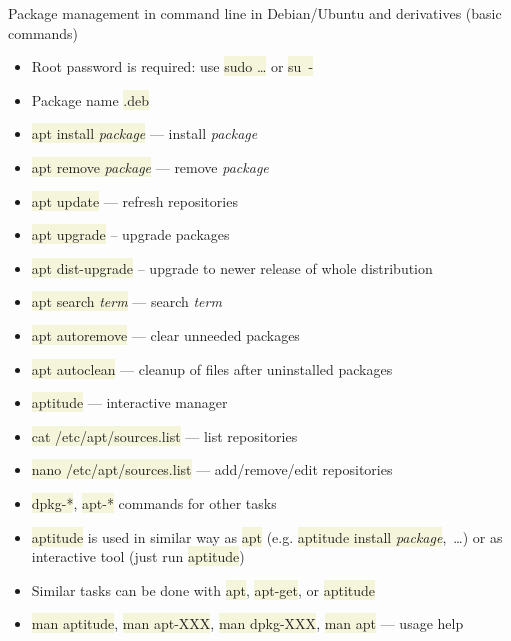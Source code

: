 \documentclass[compress, xelatex, 11pt, xcolor=svgnames, aspectratio=169,
	hyperref={
		bookmarks=true,
		unicode=true,
		colorlinks=true,
		pdftitle={Linux, command line and MetaCentrum},
		plainpages=false,
		pdfauthor={Vojtech Zeisek},
		pdfsubject={Course about use of Linux command line, writing shell scripts and using MetaCentrum of CESNET},
		pdfcreator={XeLaTeX},
		pdfkeywords={Linux, GNU, BASH, shell, command line, MetaCentrum},
		linkcolor=DarkRed, %
		anchorcolor=DarkBlue, %
		citecolor=Indigo, %
		filecolor=NavyBlue, %
		menucolor=DarkMagenta, %
		urlcolor=DarkBlue, %
		},
	url={hyphens, lowtilde} %
	]{beamer}
\renewcommand{\texttt}[1]{\colorbox{Beige}{{\ttfamily #1}}}
\begin{document}
\begin{frame}[allowframebreaks]{Package management in command line in Debian/Ubuntu and derivatives (basic commands)}
	\begin{itemize}
		\item Root password is required: use \texttt{sudo \ldots} or \texttt{su~-}
		\item Package name \texttt{*.deb}
		\item \texttt{apt install \textit{package}} --- install \textit{package}
		\item \texttt{apt remove \textit{package}} --- remove \textit{package}
		\item \texttt{apt update} --- refresh repositories
		\item \texttt{apt upgrade} -- upgrade packages
		\item \texttt{apt dist-upgrade} -- upgrade to newer release of whole distribution
		\item \texttt{apt search \textit{term}} --- search \textit{term}
		\item \texttt{apt autoremove} --- clear unneeded packages
		\item \texttt{apt autoclean} --- cleanup of files after uninstalled packages
		\item \texttt{aptitude} --- interactive manager
		\item \texttt{cat /etc/apt/sources.list} --- list repositories
		\item \texttt{nano /etc/apt/sources.list} --- add/remove/edit repositories
		\item \texttt{dpkg-*}, \texttt{apt-*} commands for other tasks
		\item \texttt{aptitude} is used in similar way as \texttt{apt} (e.g. \texttt{aptitude install \textit{package}},~\ldots) or as interactive tool (just run \texttt{aptitude})
		\item Similar tasks can be done with \texttt{apt}, \texttt{apt-get}, or \texttt{aptitude}
		\item \texttt{man aptitude}, \texttt{man apt-XXX}, \texttt{man dpkg-XXX}, \texttt{man apt} --- usage help
	\end{itemize}
\end{frame}
\end{document}

